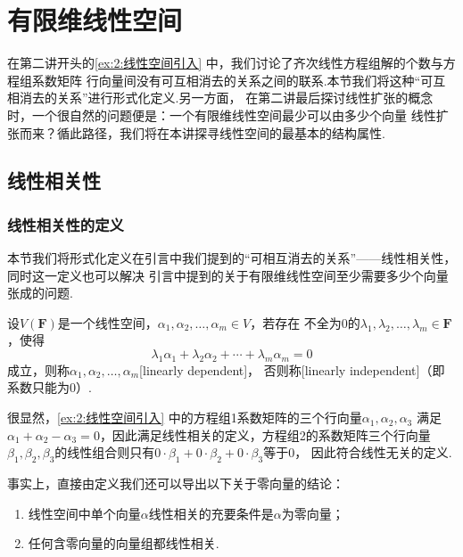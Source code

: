 \chapter{有限维线性空间}

在第二讲开头的\autoref{ex:2:线性空间引入} 中，我们讨论了齐次线性方程组解的个数与方程组系数矩阵
行向量间没有可互相消去的关系之间的联系.本节我们将这种``可互相消去的关系''进行形式化定义.另一方面，
在第二讲最后探讨线性扩张的概念时，一个很自然的问题便是：一个有限维线性空间最少可以由多少个向量
线性扩张而来？循此路径，我们将在本讲探寻线性空间的最基本的结构属性.

\section{线性相关性}
\subsection{线性相关性的定义}
本节我们将形式化定义在引言中我们提到的``可相互消去的关系''——线性相关性，同时这一定义也可以解决
引言中提到的关于有限维线性空间至少需要多少个向量张成的问题.
\begin{definition}
    设$V(\mathbf{F})$是一个线性空间，$\alpha_1,\alpha_2,\ldots,\alpha_m\in V$，若存在
    不全为0的$\lambda_1,\lambda_2,\ldots,\lambda_m\in\mathbf{F}$，使得
    \[\lambda_1\alpha_1+\lambda_2\alpha_2+\cdots+\lambda_m\alpha_m=0\]
    成立，则称$\alpha_1,\alpha_2,\ldots,\alpha_m$[linearly dependent]，
    否则称[linearly independent]（即系数只能为0）.
\end{definition}

很显然，\autoref{ex:2:线性空间引入} 中的方程组1系数矩阵的三个行向量$\alpha_1,\alpha_2,\alpha_3$
满足$\alpha_1+\alpha_2-\alpha_3=0$，因此满足线性相关的定义，方程组2的系数矩阵三个行向量
$\beta_1,\beta_2,\beta_3$的线性组合则只有$0\cdot\beta_1+0\cdot\beta_2+0\cdot\beta_3$等于0，
因此符合线性无关的定义.

事实上，直接由定义我们还可以导出以下关于零向量的结论：
\begin{enumerate}
    \item 线性空间中单个向量$\alpha$线性相关的充要条件是$\alpha$为零向量；

    \item 任何含零向量的向量组都线性相关.
\end{enumerate}

